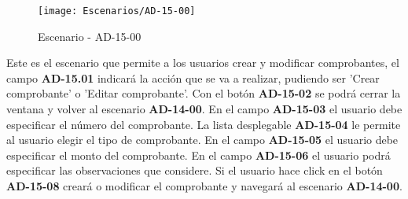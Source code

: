 \begin{figure}[H]
\centering
\texttt{[image: Escenarios/AD-15-00]}
\caption{Escenario - AD-15-00}
\label{fig:AD-15-00}
\end{figure}
Este es el escenario que permite a los usuarios crear y modificar comprobantes, el campo \textbf{AD-15.01} indicará la acción que se va a realizar, pudiendo ser 'Crear comprobante' o 'Editar comprobante'. Con el botón \textbf{AD-15-02} se podrá cerrar la ventana y volver al escenario \textbf{AD-14-00}.
En el campo \textbf{AD-15-03} el usuario debe especificar el número del comprobante. La lista desplegable \textbf{AD-15-04} le permite al usuario elegir el tipo de comprobante. En el campo \textbf{AD-15-05} el usuario debe especificar el monto del comprobante. En el campo \textbf{AD-15-06} el usuario podrá especificar las observaciones que considere. Si el usuario hace click en el botón \textbf{AD-15-08} creará o modificar el comprobante y navegará al escenario \textbf{AD-14-00}.
\\